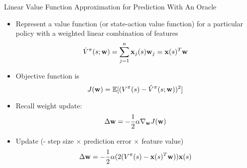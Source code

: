 \documentclass[aspectratio=169]{../latex_main/tntbeamer}  %
\begin{document}
\begin{frame}[c]{Linear Value Function Approximation for Prediction With
		An Oracle}
	
	
	\begin{itemize}
		\item Represent a value function (or state-action value function) for a
		particular policy with a weighted linear combination of features
		$$ \hat{V}^\pi(s; \mathbf{w}) = \sum_{j=1}^n \mathbf{x}_j (s) \mathbf{w}_j = \mathbf{x}(s)^T\mathbf{w}$$
		\item Objective function is 
		$$ J(\mathbf{w}) = \mathbb{E}[(V^\pi(s) - \hat{V}^\pi(s; \mathbf{w}))^2]$$
		\item Recall weight update:
		$$ \Delta \mathbf{w} = - \frac{1}{2} \alpha \nabla_{\mathbf{w}} J (\mathbf{w})$$
		\item Update (- step size $\times$ prediction error $\times$ feature value)
		$$ \Delta \mathbf{w} = -\frac{1}{2} \alpha(2(V^\pi(s) - \mathbf{x}(s)^T \mathbf{w})) \mathbf{x}(s)$$
		
	\end{itemize}
	
\end{frame}
\end{document}
